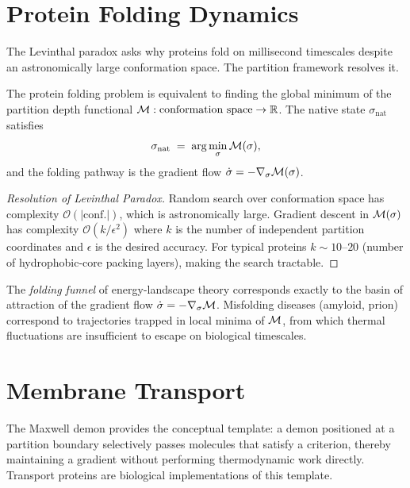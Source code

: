 \section{Protein Folding Dynamics}
\label{sec:folding}

The Levinthal paradox asks why proteins fold on millisecond timescales despite
an astronomically large conformation space.  The partition framework resolves it.

\begin{theorem}
\label{thm:folding}
The protein folding problem is equivalent to finding the global minimum of the
partition depth functional $\mathcal{M}:\text{conformation space}\to\mathbb{R}$.
The native state $\sigma_\mathrm{nat}$ satisfies
\[
    \sigma_\mathrm{nat} \;=\; \arg\min_\sigma \mathcal{M}(\sigma),
\]
and the folding pathway is the gradient flow
$\dot\sigma = -\nabla_\sigma\mathcal{M}(\sigma)$.
\end{theorem}

\begin{proof}[Resolution of Levinthal Paradox]
Random search over conformation space has complexity $\mathcal{O}(|\text{conf.}|)$,
which is astronomically large.  Gradient descent in $\mathcal{M}(\sigma)$ has
complexity $\mathcal{O}(k/\epsilon^2)$ where $k$ is the number of independent
partition coordinates and $\epsilon$ is the desired accuracy.  For typical
proteins $k \sim 10$--$20$ (number of hydrophobic-core packing layers), making
the search tractable.
\end{proof}

The \emph{folding funnel} of energy-landscape theory corresponds exactly to the
basin of attraction of the gradient flow $\dot\sigma = -\nabla_\sigma\mathcal{M}$.
Misfolding diseases (amyloid, prion) correspond to trajectories trapped in local
minima of $\mathcal{M}$, from which thermal fluctuations are insufficient to escape
on biological timescales.

\section{Membrane Transport}
\label{sec:membrane-transport}

The Maxwell demon provides the conceptual template: a demon positioned at a
partition boundary selectively passes molecules that satisfy a criterion,
thereby maintaining a gradient without performing thermodynamic work directly.
Transport proteins are biological implementations of this template.

